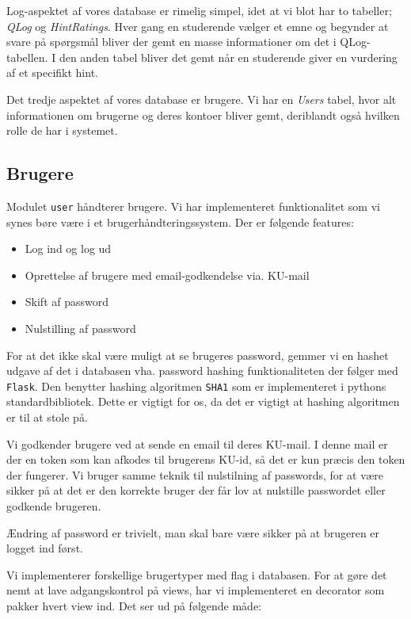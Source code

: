 \documentclass[11pt, a4paper]{article}
\begin{document}
Log-aspektet af vores database er rimelig simpel, idet at vi blot har to tabeller; \emph{QLog} og \emph{HintRatings}. Hver gang en studerende vælger et emne og begynder at svare på spørgsmål bliver der gemt en masse informationer om det i QLog-tabellen. I den anden tabel bliver det gemt når en studerende giver en vurdering af et specifikt hint.

Det tredje aspektet af vores database er brugere. Vi har en \emph{Users} tabel, hvor alt informationen om brugerne og deres kontoer bliver gemt, deriblandt også hvilken rolle de har i systemet.
\FloatBarrier

\subsection{Brugere}
\label{sub:brugere}
Modulet \texttt{user} håndterer brugere. Vi har implementeret funktionalitet som vi synes børe være i et brugerhåndteringssystem. Der er følgende features:

\begin{itemize}
    \item Log ind og log ud
    \item Oprettelse af brugere med email-godkendelse via. KU-mail
    \item Skift af password
    \item Nulstilling af password
\end{itemize}

For at det ikke skal være muligt at se brugeres password, gemmer vi en hashet udgave af det i databasen vha. password hashing funktionaliteten der følger med \verb!Flask!. Den benytter hashing algoritmen \verb!SHA1! som er implementeret i pythons standardbibliotek. Dette er vigtigt for os, da det er vigtigt at hashing algoritmen er til at stole på.

Vi godkender brugere ved at sende en email til deres KU-mail. I denne mail er der en token som kan afkodes til brugerens KU-id, så det er kun præcis den token der fungerer. Vi bruger samme teknik til nulstilning af passwords, for at være sikker på at det er den korrekte bruger der får lov at nulstille passwordet eller godkende brugeren.

Ændring af password er trivielt, man skal bare være sikker på at brugeren er logget ind først.

Vi implementerer forskellige brugertyper med flag i databasen. For at gøre det nemt at lave adgangskontrol på views, har vi implementeret en decorator som pakker hvert view ind. Det ser ud på følgende måde:
\end{document}
